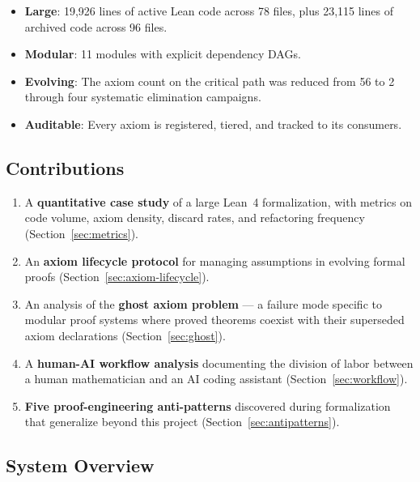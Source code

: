 \documentclass[11pt,a4paper]{article}
\theoremstyle{definition}
\begin{document}
\begin{itemize}
  \item \textbf{Large}: 19,926 lines of active Lean code across 78 files,
    plus 23,115 lines of archived code across 96 files.
  \item \textbf{Modular}: 11 modules with explicit dependency DAGs.
  \item \textbf{Evolving}: The axiom count on the critical path was
    reduced from 56 to 2 through four systematic elimination campaigns.
  \item \textbf{Auditable}: Every axiom is registered, tiered, and tracked
    to its consumers.
\end{itemize}

\subsection{Contributions}

\begin{enumerate}
  \item A \textbf{quantitative case study} of a large Lean~4 formalization,
    with metrics on code volume, axiom density, discard rates, and
    refactoring frequency (Section~\ref{sec:metrics}).
  \item An \textbf{axiom lifecycle protocol} for managing assumptions
    in evolving formal proofs (Section~\ref{sec:axiom-lifecycle}).
  \item An analysis of the \textbf{ghost axiom problem} --- a failure
    mode specific to modular proof systems where proved theorems
    coexist with their superseded axiom declarations
    (Section~\ref{sec:ghost}).
  \item A \textbf{human-AI workflow analysis} documenting the division
    of labor between a human mathematician and an AI coding assistant
    (Section~\ref{sec:workflow}).
  \item \textbf{Five proof-engineering anti-patterns} discovered during
    formalization that generalize beyond this project
    (Section~\ref{sec:antipatterns}).
\end{enumerate}

\subsection{System Overview}
\end{document}
